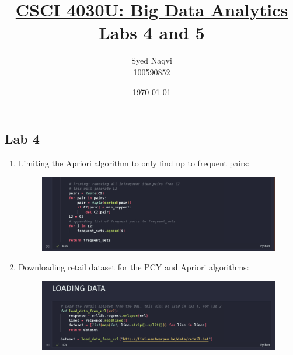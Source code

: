 \documentclass{article}
\title{\textbf{\underline{CSCI 4030U: Big Data Analytics}\\\vspace{5pt}Labs 4 and 5}}
\author{Syed Naqvi\\100590852}
\date{\today}
\begin{document}
    \maketitle
    
    \subsection*{Lab 4} 

    \begin{enumerate}[label=\alph*., left=10pt, itemsep=10pt]

        \item \begin{minipage}[t]{0.9\textwidth}
            Limiting the Apriori algorithm to only find up to frequent pairs:
            \begin{figure}[H]
                \centering
                \includegraphics[width=1\textwidth, height=0.2\textheight]{./a.png}
            \end{figure}
        \end{minipage}

        \item \begin{minipage}[t]{0.9\textwidth}
            Downloading retail dataset for the PCY and Apriori algorithms:
            \begin{figure}[H]
                \centering
                \includegraphics[width=1\textwidth, height=0.2\textheight]{./b.png}
            \end{figure}
        \end{minipage}
        
        \newpage


\end{enumerate}
\end{document}
